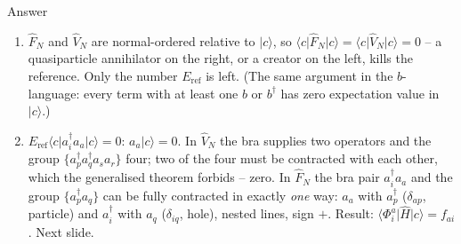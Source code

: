\documentclass[aspectratio=169,10pt]{beamer}
\newcounter{thinkctr}
\newcommand{\thinka}[1]{%
  \begin{tcolorbox}[colback=paleteal,colframe=teal,title={\bfseries Answer to pause \#\thethinkctr}]
  #1
  \end{tcolorbox}}
\newcommand{\ket}[1]{\vert #1\rangle}
\newcommand{\bra}[1]{\langle #1\vert}
\newcommand{\nc}[1]{\bigl\{#1\bigr\}}
\begin{document}
\begin{frame}{Answer}
  \thinka{
  \begin{enumerate}
    \item $\hat{F}_N$ and $\hat{V}_N$ are normal-ordered relative to $\ket{c}$, so $\bra{c}\hat{F}_N\ket{c}=\bra{c}\hat{V}_N\ket{c}=0$ -- a quasiparticle annihilator on the right, or a creator on the left, kills the reference. Only the number $E_{\mathrm{ref}}$ is left. (The same argument in the $b$-language: every term with at least one $b$ or $b^{\dagger}$ has zero expectation value in $\ket{c}$.)
    \item $E_{\mathrm{ref}}\bra{c}a_i^{\dagger}a_a\ket{c}=0$: $a_a\ket{c}=0$. In $\hat{V}_N$ the bra supplies two operators and the group $\nc{a_p^{\dagger}a_q^{\dagger}a_sa_r}$ four; two of the four must be contracted with each other, which the generalised theorem forbids -- \alert{zero}. In $\hat{F}_N$ the bra pair $a_i^{\dagger}a_a$ and the group $\nc{a_p^{\dagger}a_q}$ can be fully contracted in exactly \emph{one} way: $a_a$ with $a_p^{\dagger}$ ($\delta_{ap}$, particle) and $a_i^{\dagger}$ with $a_q$ ($\delta_{iq}$, hole), nested lines, sign $+$. Result: $\bra{\Phi_i^a}\hat{H}\ket{c}=f_{ai}$. Next slide.
  \end{enumerate}}
\end{frame}
\end{document}
